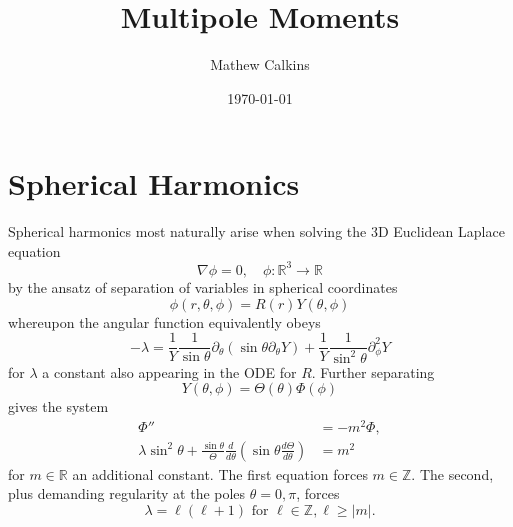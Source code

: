 \documentclass[11pt,letterpaper]{article}
\newcommand{\LP}{\left(}
\newcommand{\RP}{\right)}
\newcommand{\R}{\mathbb{R}}
\newcommand{\Z}{\mathbb{Z}}
\newcommand{\D}{\partial}
\begin{document}
\title{Multipole Moments}

\author{Mathew Calkins}

\date{\today}

 
\maketitle


\tableofcontents




\section{Spherical Harmonics}
Spherical harmonics most naturally arise when solving the 3D Euclidean Laplace equation \begin{equation}
\nabla \phi = 0, \quad \phi: \R^3 \to \R
\end{equation}
by the ansatz of separation of variables in spherical coordinates \begin{equation}
\phi(r, \theta, \phi) = R(r) Y(\theta, \phi)
\end{equation}
whereupon the angular function equivalently obeys \begin{equation}
- \lambda = \frac{1}{Y} \frac{1}{\sin \theta} \D_\theta \LP \sin \theta \D_\theta Y \RP + \frac{1}{Y} \frac{1}{\sin^2 \theta} \D_\phi^2 Y
\end{equation}
for $\lambda$ a constant also appearing in the ODE for $R$. Further separating \begin{equation}
Y(\theta, \phi) = \Theta(\theta) \Phi(\phi)
\end{equation}
gives the system \begin{equation}
\begin{aligned}
\Phi'' & = - m^2 \Phi, \\
\lambda \sin^2 \theta + \frac{\sin \theta}{\Theta} \frac{d}{d \theta} \LP \sin \theta \frac{d \Theta}{d \theta} \RP & = m^2
\end{aligned}
\end{equation}
for $m \in \R$ an additional constant. The first equation forces $m \in \Z$. The second, plus demanding regularity at the poles $\theta = 0, \pi$, forces \begin{equation}
\lambda = \ell(\ell + 1) \mbox{ for } \ell \in \Z, \ell \geq |m|.
\end{equation}
\end{document}
